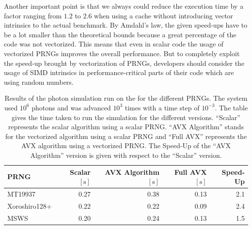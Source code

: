 \documentclass{stdlocal}
\begin{document}
    Another important point is that we always could reduce the execution time by a factor ranging from $1.2$ to $2.6$ when using a cache without introducing vector intrinsics to the actual benchmark.
    By Amdahl's law, the given speed-ups have to be a lot smaller than the theoretical bounds because a great percentage of the code was not vectorized.
    This means that even in scalar code the usage of vectorized PRNGs improves the overall performance.
    But to completely exploit the speed-up brought by vectorization of PRNGs, developers should consider the usage of SIMD intrinsics in performance-critical parts of their code which are using random numbers.

    \newpage

    \begin{table}[H]
      \center
      \caption[Photon Simulation Results for ]{
        Results of the photon simulation run on the  for the different PRNGs.
        The system used $10^6$ photons and was advanced $10^3$ times with a time step of $10^{-3}$.
        The table gives the time taken to run the simulation for the different versions.
        \enquote{Scalar} represents the scalar algorithm using a scalar PRNG.
        \enquote{AVX Algorithm} stands for the vectorized algorithm using a scalar PRNG and \enquote{Full AVX} represents the AVX algorithm using a vectorized PRNG.
        The Speed-Up of the \enquote{AVX Algorithm} version is given with respect to the \enquote{Scalar} version.
      }
      \label{tab:photon-results}
      \begin{tabular}{lrrrr}
        \hline
        \textbf{PRNG} & \textbf{Scalar $[\mathrm{s}]$} & \textbf{AVX Algorithm $[\mathrm{s}]$} & \textbf{Full AVX $[\mathrm{s}]$} & \textbf{Speed-Up} \\
        \hline
        \hline
        MT19937 & 0.27 & 0.38 & 0.13 & 2.1 \\
        Xoroshiro128+ & 0.22 & 0.22 & 0.09 & 2.4 \\
        MSWS & 0.20 & 0.24 & 0.13 & 1.5 \\
        \hline
      \end{tabular}
    \end{table}
\end{document}

